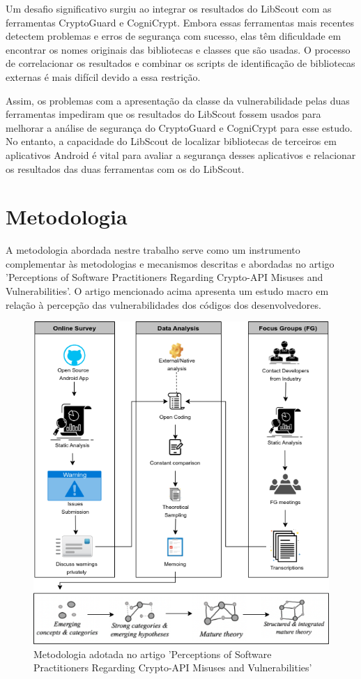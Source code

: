 Um desafio significativo surgiu ao integrar os resultados do LibScout com as ferramentas CryptoGuard e CogniCrypt. Embora essas ferramentas mais recentes detectem problemas e erros de segurança com sucesso, elas têm dificuldade em encontrar os nomes originais das bibliotecas e classes que são usadas. O processo de correlacionar os resultados e combinar os scripts de identificação de bibliotecas externas é mais difícil devido a essa restrição.

Assim, os problemas com a apresentação da classe da vulnerabilidade pelas duas ferramentas impediram que os resultados do LibScout fossem usados para melhorar a análise de segurança do CryptoGuard e CogniCrypt para esse estudo. No entanto, a capacidade do LibScout de localizar bibliotecas de terceiros em aplicativos Android é vital para avaliar a segurança desses aplicativos e relacionar os resultados das duas ferramentas com os do LibScout.


\section{Metodologia}

A metodologia abordada nestre trabalho serve como um instrumento complementar às metodologias e mecanismos descritas e abordadas no artigo 'Perceptions of Software Practitioners Regarding Crypto-API Misuses and Vulnerabilities'.
O artigo mencionado acima apresenta um estudo macro em relação à percepção das vulnerabilidades dos códigos dos desenvolvedores.

\begin{figure}[!h]
  \centering
  \includegraphics[scale=0.5]{img/metodologia.png}
  \caption{Metodologia adotada no artigo 'Perceptions of Software Practitioners Regarding Crypto-API Misuses and Vulnerabilities'}
  \label{averageWarnings}
\end{figure}


